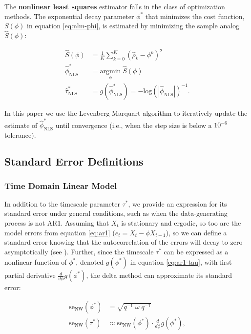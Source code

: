 \documentclass[main.tex]{subfiles}
\begin{document}
The \textbf{nonlinear least squares} estimator falls in the class of optimization methods. The exponential decay parameter $\phi^*$ that minimizes the cost function, $S(\phi)$ in equation \eqref{eq:nlm-phi}, is estimated by minimizing the sample analog $\widehat{S}(\phi)$:

\begin{align}
    \widehat{S}(\phi) &= \frac{1}{K} \sum_{k=0}^K (\hat\rho_k - \phi^k)^2\\
    \hat \phi^*_{\scriptscriptstyle\text{NLS}} &= \underset{\phi}{\text{argmin}} \; \widehat{S}(\phi)\\
    \hat \tau^*_{\scriptscriptstyle\text{NLS}} &= g(\hat \phi^*_{\scriptscriptstyle\text{NLS}}) = -{\text{log}(|\hat\phi_{\scriptscriptstyle\text{NLS}}|)}^{-1}.
\end{align}

\noindent In this paper we use the Levenberg-Marquart algorithm to iteratively update the estimate of $\hat \phi^*_{\scriptscriptstyle\text{NLS}}$ until convergence (i.e., when the step size is below a $10^{-6}$ tolerance).\\

\subsection{Standard Error Definitions}
\subsubsection{Time Domain Linear Model}

In addition to the timescale parameter $\tau^*$, we provide an expression for its standard error under general conditions, such as when the data-generating process is not AR1. Assuming that $X_t$ is stationary and ergodic, so too are the model errors from equation \eqref{eq:ar1} ($e_t = X_t - \phi X_{t-1}$), so we can define a standard error knowing that the autocorrelation of the errors will decay to zero asymptotically (see ). Further, since the timescale $\tau^*$ can be expressed as a nonlinear function of $\phi^*$, denoted $g(\phi^*)$ in equation \eqref{eq:ar1-tau}, with first partial derivative $\frac{d}{d\phi} g(\phi^*)$, the delta method can approximate its standard error:

\begin{align}
    \text{se}_{\text{NW}}(\phi^*) &= \sqrt{q^{-1}\; \omega \; q^{-1}} \label{eq:se-ar1-phi}\\
    \text{se}_{\text{NW}}(\tau^*) &\approx \text{se}_{\text{NW}}(\phi^*) \cdot \frac{d}{d\phi} g(\phi^*),
\end{align}
\end{document}

